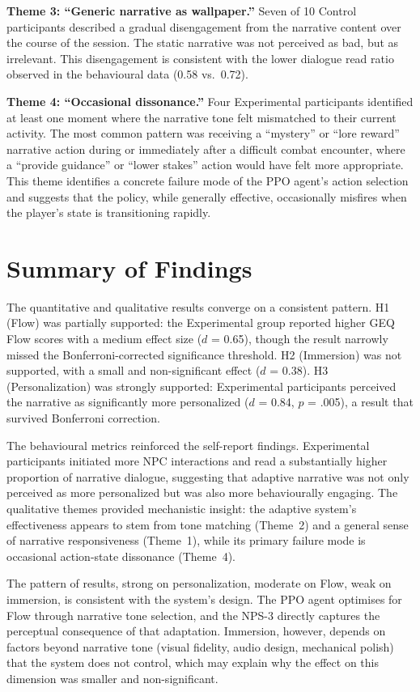 \textbf{Theme 3: ``Generic narrative as wallpaper.''} Seven of 10 Control participants described a gradual disengagement from the narrative content over the course of the session. The static narrative was not perceived as bad, but as irrelevant. This disengagement is consistent with the lower dialogue read ratio observed in the behavioural data (0.58 vs.\ 0.72).

\textbf{Theme 4: ``Occasional dissonance.''} Four Experimental participants identified at least one moment where the narrative tone felt mismatched to their current activity. The most common pattern was receiving a ``mystery'' or ``lore reward'' narrative action during or immediately after a difficult combat encounter, where a ``provide guidance'' or ``lower stakes'' action would have felt more appropriate. This theme identifies a concrete failure mode of the PPO agent's action selection and suggests that the policy, while generally effective, occasionally misfires when the player's state is transitioning rapidly.

\section{Summary of Findings}

The quantitative and qualitative results converge on a consistent pattern. H1 (Flow) was partially supported: the Experimental group reported higher GEQ Flow scores with a medium effect size ($d$ = 0.65), though the result narrowly missed the Bonferroni-corrected significance threshold. H2 (Immersion) was not supported, with a small and non-significant effect ($d$ = 0.38). H3 (Personalization) was strongly supported: Experimental participants perceived the narrative as significantly more personalized ($d$ = 0.84, $p$ = .005), a result that survived Bonferroni correction.

The behavioural metrics reinforced the self-report findings. Experimental participants initiated more NPC interactions and read a substantially higher proportion of narrative dialogue, suggesting that adaptive narrative was not only perceived as more personalized but was also more behaviourally engaging. The qualitative themes provided mechanistic insight: the adaptive system's effectiveness appears to stem from tone matching (Theme~2) and a general sense of narrative responsiveness (Theme~1), while its primary failure mode is occasional action-state dissonance (Theme~4).

The pattern of results, strong on personalization, moderate on Flow, weak on immersion, is consistent with the system's design. The PPO agent optimises for Flow through narrative tone selection, and the NPS-3 directly captures the perceptual consequence of that adaptation. Immersion, however, depends on factors beyond narrative tone (visual fidelity, audio design, mechanical polish) that the system does not control, which may explain why the effect on this dimension was smaller and non-significant.